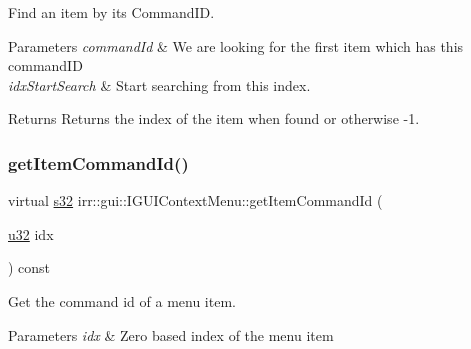 Find an item by it\textquotesingle{}s Command\+ID. 


\begin{DoxyParams}{Parameters}
{\em command\+Id} & We are looking for the first item which has this command\+ID \\
\hline
{\em idx\+Start\+Search} & Start searching from this index. \\
\hline
\end{DoxyParams}
\begin{DoxyReturn}{Returns}
Returns the index of the item when found or otherwise -\/1. 
\end{DoxyReturn}
\mbox{\label{classirr_1_1gui_1_1IGUIContextMenu_a5edfede62ed558acd68b06eeea0682c3}} 
\subsubsection{\texorpdfstring{get\+Item\+Command\+Id()}{getItemCommandId()}}
{\footnotesize\ttfamily virtual \hyperlink{namespaceirr_ac66849b7a6ed16e30ebede579f9b47c6}{s32} irr\+::gui\+::\+I\+G\+U\+I\+Context\+Menu\+::get\+Item\+Command\+Id (\begin{DoxyParamCaption}\item[{\hyperlink{namespaceirr_a0416a53257075833e7002efd0a18e804}{u32}}]{idx }\end{DoxyParamCaption}) const\hspace{0.3cm}{\ttfamily [pure virtual]}}



Get the command id of a menu item. 


\begin{DoxyParams}{Parameters}
{\em idx} & Zero based index of the menu item \\
\hline
\end{DoxyParams}
\mbox{\label{classirr_1_1gui_1_1IGUIContextMenu_a18cf836d001f425f617c5a36db3d1ae6}} 
